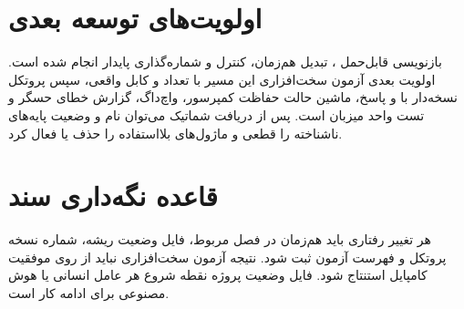 \section{اولویت‌های توسعه بعدی}
بازنویسی قابل‌حمل ، تبدیل هم‌زمان، کنترل  و شماره‌گذاری پایدار انجام شده است. اولویت بعدی آزمون سخت‌افزاری این مسیر با تعداد و کابل واقعی، سپس پروتکل نسخه‌دار با  و پاسخ، ماشین حالت حفاظت کمپرسور، واچ‌داگ، گزارش خطای حسگر و تست واحد میزبان است. پس از دریافت شماتیک می‌توان نام و وضعیت پایه‌های ناشناخته را قطعی و ماژول‌های بلااستفاده را حذف یا فعال کرد.

\section{قاعده نگه‌داری سند}
هر تغییر رفتاری باید هم‌زمان در فصل مربوط، فایل وضعیت ریشه، شماره نسخه پروتکل و فهرست آزمون ثبت شود. نتیجه آزمون سخت‌افزاری نباید از روی موفقیت کامپایل استنتاج شود. فایل وضعیت پروژه نقطه شروع هر عامل انسانی یا هوش مصنوعی برای ادامه کار است.
